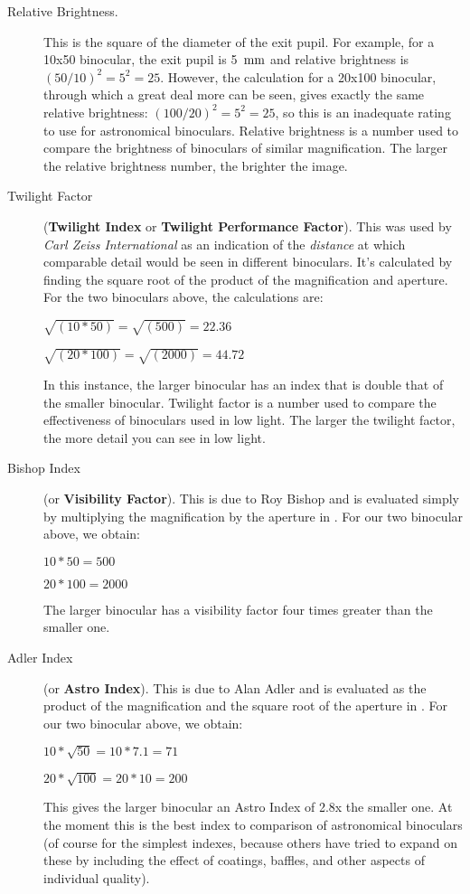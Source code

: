 \begin{description}
\item[Relative Brightness.] This is the square of the diameter of the exit pupil. 
For example, for a 10x50 binocular, the exit pupil is 5 $\,\mathrm{mm}$ and relative brightness 
is $(50/10)^2=5^2=25$. However, the calculation for a 20x100 binocular, through which 
a great deal more can be seen, gives exactly the same relative brightness: $(100/20)^2=5^2=25$, 
so this is an inadequate rating to use for astronomical binoculars. Relative brightness 
is a number used to compare the brightness of binoculars of similar magnification. 
The larger the relative brightness number, the brighter the image. 
\item[Twilight Factor] (\textbf{Twilight Index} or \textbf{Twilight Performance Factor}). 
This was used by \textit{Carl Zeiss International} as an indication of the \textit{distance} 
at which comparable detail would be seen in different binoculars. It's calculated by 
finding the square root of the product of the magnification and aperture. For the 
two binoculars above, the calculations are:

\begin{center}
$\sqrt{(10*50)}=\sqrt{(500)}=22.36$

$\sqrt{(20*100)}=\sqrt{(2000)}=44.72$
\end{center}

In this instance, the larger binocular has an index that is double that of the smaller 
binocular. Twilight factor is a number used to compare the effectiveness of binoculars 
used in low light. The larger the twilight factor, the more detail you can see in low 
light. 
\item[Bishop Index] (or \textbf{Visibility Factor}). This is due to Roy Bishop \citep{Bishop:2002} 
and is evaluated simply by multiplying the magnification by the aperture in \mm. For 
our two binocular above, we obtain:

\begin{center}
$10*50=500$

$20*100=2000$
\end{center}

The larger binocular has a visibility factor four times greater than the smaller one.
\item[Adler Index] (or \textbf{Astro Index}). This is due to Alan Adler \citep{Adler:2002} and 
is evaluated as the product of the magnification and the square root of the aperture in \mm.
For our two binocular above, we obtain:
\begin{center}
$10*\sqrt{50}=10*7.1=71$

$20*\sqrt{100}=20*10=200$
\end{center}
This gives the larger binocular an Astro Index of 2.8x the smaller one. At the moment 
this is the best index to comparison of astronomical binoculars (of course for the 
simplest indexes, because others have tried to expand on these by including the effect of coatings, baffles, and other aspects of individual quality).
\end{description}

